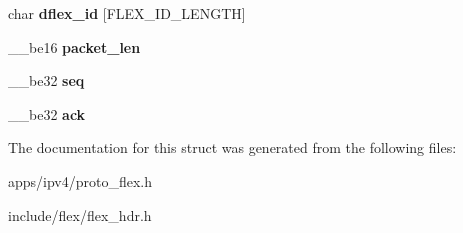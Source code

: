 \begin{DoxyCompactItemize}
\item 
char {\bfseries dflex\+\_\+id} \mbox{[}F\+L\+E\+X\+\_\+\+I\+D\+\_\+\+L\+E\+N\+G\+TH\mbox{]}\hypertarget{structflexhdr_aab2628ec55f6dedda9cd48de1677d49c}{}\label{structflexhdr_aab2628ec55f6dedda9cd48de1677d49c}

\item 
\+\_\+\+\_\+be16 {\bfseries packet\+\_\+len}\hypertarget{structflexhdr_a8e177eb08fa03f382eb67f75d9bf16b9}{}\label{structflexhdr_a8e177eb08fa03f382eb67f75d9bf16b9}

\item 
\+\_\+\+\_\+be32 {\bfseries seq}\hypertarget{structflexhdr_a1f437e344ae8752c7ea0586104bf67b4}{}\label{structflexhdr_a1f437e344ae8752c7ea0586104bf67b4}

\item 
\+\_\+\+\_\+be32 {\bfseries ack}\hypertarget{structflexhdr_a9504db4a12b79baa7937e1d11f521e57}{}\label{structflexhdr_a9504db4a12b79baa7937e1d11f521e57}

\end{DoxyCompactItemize}


The documentation for this struct was generated from the following files\+:\begin{DoxyCompactItemize}
\item 
apps/ipv4/proto\+\_\+flex.\+h\item 
include/flex/flex\+\_\+hdr.\+h\end{DoxyCompactItemize}
